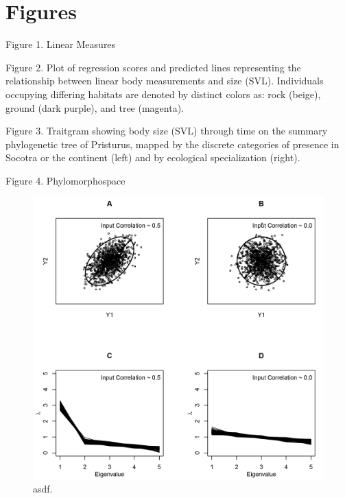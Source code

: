 \documentclass[
]{article}
\begin{document}
\newpage

\hypertarget{figures}{%
\section{Figures}\label{figures}}

Figure 1. Linear Measures \hfill\break

Figure 2. Plot of regression scores and predicted lines representing the
relationship between linear body measurements and size (SVL).
Individuals occupying differing habitats are denoted by distinct colors
as: rock (beige), ground (dark purple), and tree (magenta). \hfill\break

Figure 3. Traitgram showing body size (SVL) through time on the summary
phylogenetic tree of Pristurus, mapped by the discrete categories of
presence in Socotra or the continent (left) and by ecological
specialization (right). \hfill\break

Figure 4. Phylomorphospace

\newpage

\begin{figure}[H]
\includegraphics[width=1\linewidth]{Figs/Fig1} \caption{asdf.}\label{fig:unnamed-chunk-1}
\end{figure}

\newpage
\end{document}

